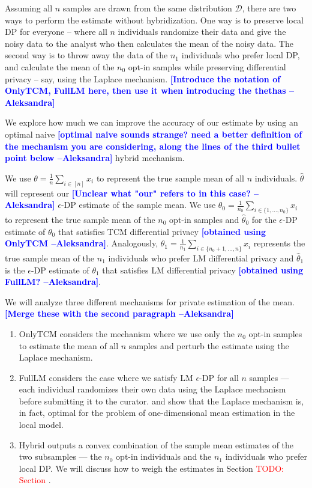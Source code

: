 \documentclass{article}
\newcommand{\ak}[1]{\textcolor{blue}{\bf\small [#1 --Aleksandra]}}
\newcommand\TODO[1]{\textcolor{red}{TODO: {#1}}}
\theoremstyle{plain}
\begin{document}
Assuming all $n$ samples are drawn from the same distribution $\mathcal{D}$, there are two ways to perform the estimate without hybridization. One way is to preserve local DP for everyone -- where all $n$ individuals randomize their data and give the noisy data to the analyst who then calculates the mean of the noisy data. The second way is to throw away the data of the $n_1$ individuals who prefer local DP, and calculate the mean of the $n_0$ opt-in samples while preserving differential privacy -- say, using the Laplace mechanism. \ak{Introduce the notation of OnlyTCM, FullLM here, then use it when introducing the thethas}

We explore how much we can improve the accuracy of our estimate by using an optimal naive \ak{optimal naive sounds strange? need a better definition of the mechanism you are considering, along the lines of the third bullet point below} hybrid mechanism. 

We use $\theta = \frac{1}{n}\sum_{i \in [n]}x_i$ to represent the true sample mean of all $n$ individuals. $\hat{\theta}$ will represent our \ak{Unclear what "our" refers to in this case?} $\epsilon$-DP estimate of the sample mean. We use $\theta_0 = \frac{1}{n_0}\sum_{i \in \{1, \dots, n_0\}} x_i$ to represent the true sample mean of the $n_0$ opt-in samples and $\hat{\theta}_0$ for the $\epsilon$-DP estimate of $\theta_0$ that satisfies TCM differential privacy \ak{obtained using OnlyTCM}. Analogously, $\theta_1 = \frac{1}{n_1}\sum_{i \in \{n_0+1, \dots, n\}} x_i$ represents the true sample mean of the $n_1$ individuals who prefer LM differential privacy and $\hat{\theta}_1$ is the $\epsilon$-DP estimate of $\theta_1$ that satisfies LM differential privacy \ak{obtained using FullLM?}. 

We will analyze three different mechanisms for private estimation of the mean. \ak{Merge these with the second paragraph}
\begin{enumerate}
\item OnlyTCM considers the mechanism where we use only the $n_0$ opt-in samples to estimate the mean of all $n$ samples and perturb the estimate using the Laplace mechanism. 
\item FullLM considers the case where we satisfy LM $\epsilon$-DP for all $n$ samples — each individual randomizes their own data using the Laplace mechanism before submitting it to the curator. \cite{duchi} and \cite{dky18} show that the Laplace mechanism is, in fact, optimal for the problem of one-dimensional mean estimation in the local model. 
\item Hybrid outputs a convex combination of the sample mean estimates of the two subsamples — the $n_0$ opt-in individuals and the $n_1$ individuals who prefer local DP. We will discuss how to weigh the estimates in Section \TODO{Section }. 
\end{enumerate}
\end{document}
